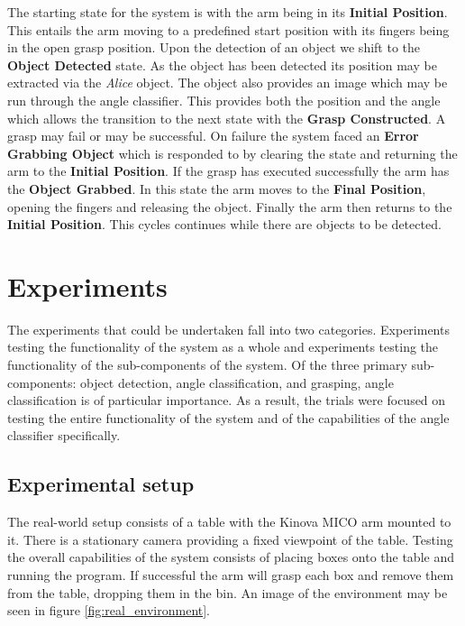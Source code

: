 \documentclass[letterpaper, 10 pt, conference]{conf/ieeeconf}  %
\begin{document}
\newpage
The starting state for the system is with the arm being in its \textbf{Initial
  Position}. This entails the arm moving to a predefined start position with its
fingers being in the open grasp position. Upon the detection of an object we
shift to the \textbf{Object Detected} state. As the object has been detected its
position may be extracted via the \textit{Alice} object. The object also
provides an image which may be run through the angle classifier. This provides
both the position and the angle which allows the transition to the next state
with the \textbf{Grasp Constructed}. A grasp may fail or may be successful. On
failure the system faced an \textbf{Error Grabbing Object} which is responded to
by clearing the state and returning the arm to the \textbf{Initial Position}. If
the grasp has executed successfully the arm has the \textbf{Object Grabbed}. In
this state the arm moves to the \textbf{Final Position}, opening the fingers and
releasing the object. Finally the arm then returns to the \textbf{Initial
  Position}. This cycles continues while there are objects to be detected.


\section{Experiments}
The experiments that could be undertaken fall into two categories. Experiments
testing the functionality of the system as a whole and experiments testing the
functionality of the sub-components of the system. Of the three primary
sub-components: object detection, angle classification, and grasping, angle
classification is of particular importance. As a result, the trials were focused
on testing the entire functionality of the system and of the capabilities of the
angle classifier specifically.

\subsection{Experimental setup}
The real-world setup consists of a table with the Kinova MICO arm mounted to it.
There is a stationary camera providing a fixed viewpoint of the table. Testing
the overall capabilities of the system consists of placing boxes onto the table
and running the program. If successful the arm will grasp each box and remove
them from the table, dropping them in the bin. An image of the environment may
be seen in figure \ref{fig:real_environment}.
\end{document}
